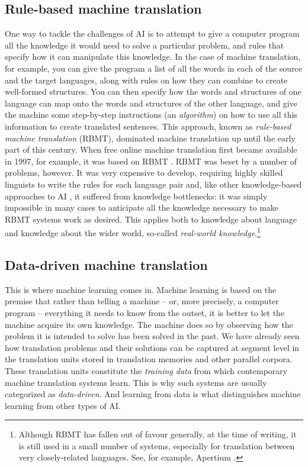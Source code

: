 \documentclass[output=paper]{langscibook}
\begin{document}
\subsection{Rule-based machine translation}
One way to tackle the challenges of AI is to attempt to give a computer program all the knowledge it would need to solve a particular problem, and rules that specify how it can manipulate this knowledge. In the case of machine translation, for example, you can give the program a list of all the words in each of the source and the target languages, along with rules on how they can combine to create well-formed structures. You can then specify how the words and structures of one language can map onto the words and structures of the other language, and give the machine some step-by-step instructions (an \textit{algorithm}) on how to use all this information to create translated sentences. This approach, known as \textit{rule-based machine translation} (RBMT), dominated machine translation up until the early part of this century. When free online machine translation first became available in 1997, for example, it was based on RBMT \citep{Joscelyne1998}. RBMT was beset by a number of problems, however. It was very expensive to develop, requiring highly skilled linguists to write the rules for each language pair and, like other knowledge-based approaches to AI \citep{deeplearningbook}, it suffered from knowledge bottlenecks: it was simply impossible in many cases to anticipate all the knowledge necessary to make RBMT systems work as desired. This applies both to knowledge about language and knowledge about the wider world, so-called \textit{real-world knowledge}.\footnote{Although RBMT has fallen out of favour generally, at the time of writing, it is still used in a small number of systems, especially for translation between very closely-related languages. See, for example, Apertium \citep{Forcada2011}.}

\subsection{Data-driven machine translation}
This is where machine learning comes in. Machine learning is based on the premise that rather than telling a machine -- or, more precisely, a computer program -- everything it needs to know from the outset, it is better to let the machine acquire its own knowledge. The machine does so by observing how the problem it is intended to solve has been solved in the past. We have already seen how  translation problems and their solutions can be captured at segment level in the translation units stored in translation memories and other parallel corpora. These translation units constitute the  \textit{training data} from which contemporary machine translation systems learn. This is why such systems are usually categorized as \textit{data-driven}. And learning from data is what distinguishes machine learning from other types of AI.
\end{document}
